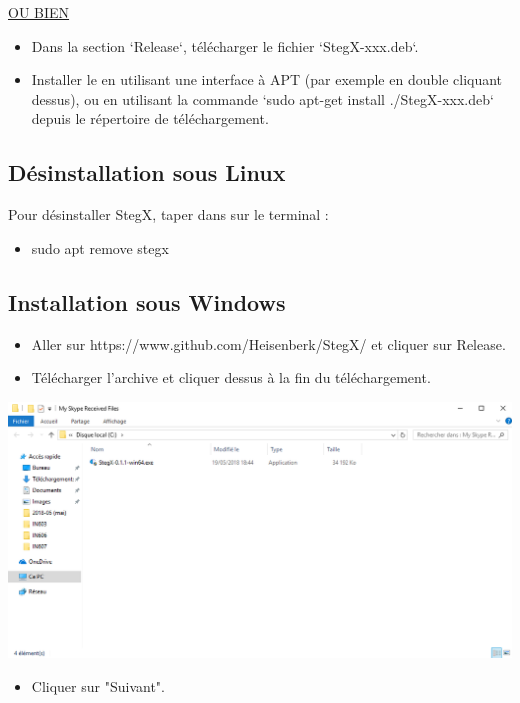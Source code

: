 \documentclass[11pt]{article}
\begin{document}
\underline{OU BIEN}

\begin{itemize}
\item Dans la section `Release`, télécharger le fichier `StegX-xxx.deb`.
\item Installer le en utilisant une interface à APT (par exemple en double cliquant
dessus), ou en utilisant la commande `sudo apt-get install ./StegX-xxx.deb`
depuis le répertoire de téléchargement.
\end{itemize}

\subsection{Désinstallation sous Linux}

Pour désinstaller StegX, taper dans sur le terminal : 
\begin{itemize}
\item sudo apt remove stegx
\end{itemize}

\subsection{Installation sous Windows}

\begin{itemize}
\item Aller sur https://www.github.com/Heisenberk/StegX/ et cliquer sur Release.
\item Télécharger l'archive et cliquer dessus à la fin du téléchargement.
\end{itemize}

\hspace{1cm}
\includegraphics[scale=0.5]{pictures/ouverture.png}
\vspace{1cm}

\begin{itemize}
\item Cliquer sur "Suivant". 
\end{itemize}
\end{document}
